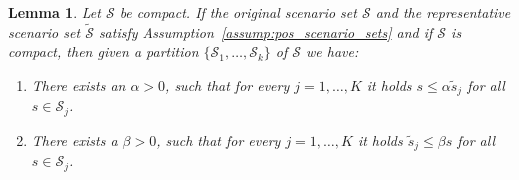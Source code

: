 \documentclass{article}
\newtheorem{lemma}[theorem]{Lemma}
\newcommand{\mS}{\mathcal{S}}
\newcommand{\tS}{\tilde{\mS}}
\newcommand{\newscen}[1]{\tilde{s}_{#1}}%
\begin{document}
\begin{lemma}
	\label{assump:scenario_bounds}
	Let $\mS$ be compact. If the original scenario set \(\mS\) and the representative scenario set \(\tS\) satisfy Assumption~\ref{assump:pos_scenario_sets} and if \(\mS\) is compact, then given a partition \(\{\mS_1,\dots,\mS_k\}\) of \(\mS\) we have:
	\begin{enumerate}[label=(\roman*)]
		\item There exists an \(\alpha>0\), such that for every \(j=1,\ldots,K\) it holds \(s \leq \alpha \newscen{j}\) for all \(s\in \mS_{j}\).
		\item There exists a \(\beta>0\), such that for every \(j=1,\ldots,K\) it holds \(\newscen{j}\leq \beta s\) for all \(s\in \mS_{j}\).
	\end{enumerate}
\end{lemma}
\end{document}
